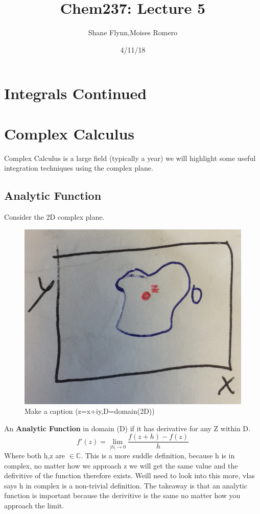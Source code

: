 \documentclass{article}
\title{Chem237: Lecture 5}
\date{4/11/18}
\author{Shane Flynn,Moises Romero}
\newcommand{\be}{\begin{equation}}
\newcommand{\ee}{\end{equation}}
\begin{document}
\maketitle
\section*{Integrals Continued}
\section*{Complex Calculus }
Complex Calculus is a large field (typically a year) we will highlight some useful integration techniques using the complex plane. 

\subsection*{Analytic Function}
Consider the 2D complex plane. 
\begin{figure}[h]
  \centering
  \includegraphics[scale=0.2]{Figures/complex.png}
    \caption{Make a caption (z=x+iy,D=domain(2D))}
  \label{fig:under_damped}
\end{figure}
An \textbf{Analytic Function} in domain (D) if it has derivative for any Z within D.
\be
f'(z) = \lim_{|h|\to 0} \frac{f(z+h)-f(z)}{h}
\ee
Where both h,z are $\in \mathbb{C}$. This is a more suddle definition, because h is in complex, no matter how we approach z we will get the same value and the defivitive of the function therefore exists. Weill need to look into this more, vlas says h in complex is a non-trivial definition. 
The takeaway is that an analytic function is important because the derivitive is the same no matter how you approach the limit. 
\end{document}
